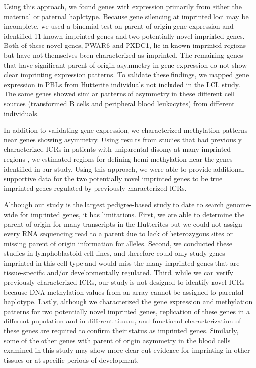 Using this approach, we found genes with expression primarily from either the maternal or paternal haplotype. Because gene silencing at imprinted loci may be incomplete, we used a binomial test on parent of origin gene expression and identified 11 known imprinted genes and two potentially novel imprinted genes. Both of these novel genes, PWAR6 and PXDC1, lie in known imprinted regions but have not themselves been characterized as imprinted. The remaining genes that have significant parent of origin asymmetry in gene expression do not show clear imprinting expression patterns. To validate these findings, we mapped gene expression in PBLs from Hutterite individuals not included in the LCL study. The same genes showed similar patterns of asymmetry in these different cell sources (transformed B cells and peripheral blood leukocytes) from different individuals.

In addition to validating gene expression, we characterized methylation patterns near genes showing asymmetry. Using results from studies that had previously characterized ICRs in patients with uniparental disomy at many imprinted regions \citep{Joshi:2016bb, Court:2014kc}, we estimated regions for defining hemi-methylation near the genes identified in our study. Using this approach, we were able to provide additional supportive data for the two potentially novel imprinted genes to be true imprinted genes regulated by previously characterized ICRs. 

Although our study is the largest pedigree-based study to date to search genome-wide for imprinted genes, it has limitations. First, we are able to determine the parent of origin for many transcripts in the Hutterites but we could not assign every RNA sequencing read to a parent due to lack of heterozygous sites or missing parent of origin information for alleles. Second, we conducted these studies in lymphoblastoid cell lines, and therefore could only study genes imprinted in this cell type and would miss the many imprinted genes that are tissue-specific and/or developmentally regulated. Third, while we can verify previously characterized ICRs, our study is not designed to identify novel ICRs because DNA methylation values from an array cannot be assigned to parental haplotype. Lastly, although we characterized the gene expression and methylation patterns for two potentially novel imprinted genes, replication of these genes in a different population and in different tissues, and functional characterization of these genes are required to confirm their status as imprinted genes. Similarly, some of the other genes with parent of origin asymmetry in the blood cells examined in this study may show more clear-cut evidence for imprinting in other tissues or at specific periods of development.  

